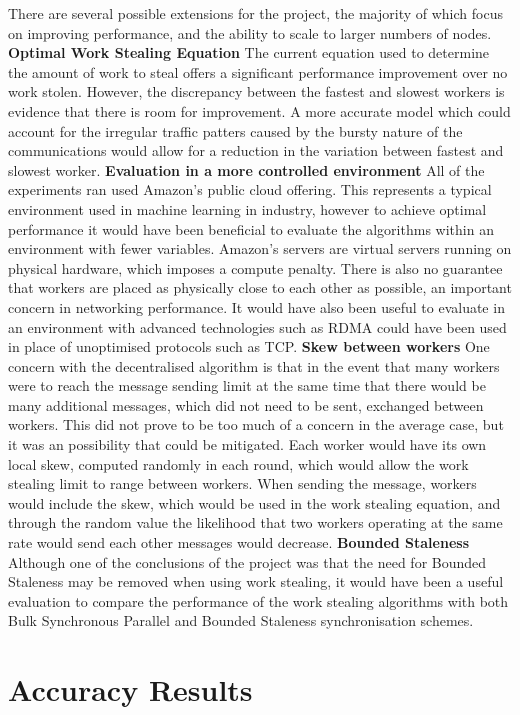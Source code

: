 \documentclass[12pt]{article}
\begin{document}
There are several possible extensions for the project, the majority of which focus on improving performance, and the ability to scale to larger numbers of nodes.
\newline
\newline
\textbf{Optimal Work Stealing Equation}		The current equation used to determine the amount of work to steal offers a significant performance improvement over no work stolen. However, the discrepancy between the fastest and slowest workers is evidence that there is room for improvement. A more accurate model which could account for the irregular traffic patters caused by the bursty nature of the communications would allow for a reduction in the variation between fastest and slowest worker.
\newline
\newline
\textbf{Evaluation in a more controlled environment}		All of the experiments ran used Amazon's public cloud offering. This represents a typical environment used in machine learning in industry, however to achieve optimal performance it would have been beneficial to evaluate the algorithms within an environment with fewer variables. Amazon's servers are virtual servers running on physical hardware, which imposes a compute penalty. There is also no guarantee that workers are placed as physically close to each other as possible, an important concern in networking performance. It would have also been useful to evaluate in an environment with advanced technologies such as RDMA could have been used in place of unoptimised protocols such as TCP.
\newline
\newline
\textbf{Skew between workers}	One concern with the decentralised algorithm is that in the event that many workers were to reach the message sending limit at the same time that there would be many additional messages, which did not need to be sent, exchanged between workers. This did not prove to be too much of a concern in the average case, but it was an possibility that could be mitigated. Each worker would have its own local skew, computed randomly in each round, which would allow the work stealing limit to range between workers. When sending the  message, workers would include the skew, which would be used in the work stealing equation, and through the random value the likelihood that two workers operating at the same rate would send each other  messages would decrease.
\newline
\newline
\textbf{Bounded Staleness}		Although one of the conclusions of the project was that the need for Bounded Staleness may be removed when using work stealing, it would have been a useful evaluation to compare the performance of the work stealing algorithms with both Bulk Synchronous Parallel and Bounded Staleness synchronisation schemes.	

\newpage

\appendix
\section{Accuracy Results}

\newpage



\end{document}
